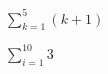 
%
%
%

	
	\begin{subproblem}
		\item $\sum\limits_{k=1}^5 (k + 1)$
		\skipitem
		\item $\sum\limits_{i=1}^{10} 3$
	\end{subproblem}

\solution
	\begin{subproblem}
		\item 
		\skipitem
		\item 
	\end{subproblem}
